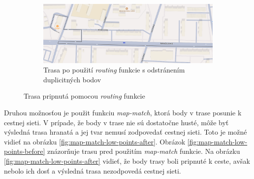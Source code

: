\begin{figure}
\begin{subfigure}{0.9\textwidth}
        \centering
        \includegraphics[width=\textwidth]{img/routing/po po.png}
        \caption{Trasa po použití \textit{routing} funkcie s odstránením duplicitných bodov}
        \label{fig:routing-after-after}
    \end{subfigure}
    \caption{Trasa pripnutá pomocou \textit{routing} funkcie}
    \label{fig:routing}
\end{figure}

Druhou možnosťou je použit funkciu \textit{map-match}, ktorá body v trase posunie k cestnej sieti. V prípade, že body v trase nie sú dostatočne husté, môže byť výsledná trasa hranatá a jej tvar nemusí zodpovedať cestnej sieti. Toto je možné vidieť na obrázku \ref{fig:map-match-low-points-after}. Obrázok \ref{fig:map-match-low-points-before} znázorňuje trasu pred použitím \textit{map-match} funkcie. Na obrázku \ref{fig:map-match-low-points-after} vidieť, že body trasy boli pripnuté k ceste, avšak nebolo ich dosť a výsledná trasa nezodpovedá cestnej sieti.

